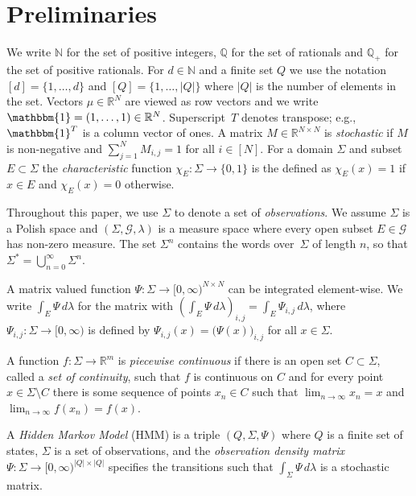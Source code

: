 \documentclass[a4paper,UKenglish,cleveref, autoref,mathscr]{lipics-v2019}
\newcommand{\RR}{\mathbb{R}}
\newcommand{\NN}{\mathbb{N}}
\newcommand{\QQ}{\mathbb{Q}}
\newcommand{\GG}{\mathscr{G}}
\newcommand{\1}{\mathbbm{1}}
\begin{document}
\section{Preliminaries}
We write $\NN$ for the set of positive integers, $\QQ$ for the set of rationals and $\QQ_+$ for the set of positive rationals.
For $d \in \NN$ and a finite set $Q$ we use the notation $[d] = \{1, \dots, d\}$ and $[Q] = \{1, \dots, |Q|\}$ where $|Q|$ is the number of elements in the set. Vectors $\mu \in \RR^N$ are viewed as row vectors and we write $\1 = (1, \dots, 1) \in \RR^N$.
Superscript~$T$ denotes transpose; e.g., $\1^T$ is a column vector of ones.
A matrix $M \in \RR^{N \times N}$ is \emph{stochastic} if $M$ is non-negative and $\sum_{j = 1}^{N} M_{i,j} = 1$ for all $i \in [N]$.
For a domain $\Sigma$ and subset $E \subset \Sigma$ the \emph{characteristic} function $\chi_E : \Sigma \rightarrow \{0,1\}$ is the defined as $\chi_E(x) = 1$ if $x \in E$ and $\chi_E(x) = 0$ otherwise.

Throughout this paper, we use $\Sigma$ to denote a set of \emph{observations}.
We assume $\Sigma$ is a Polish space and $(\Sigma, \GG, \lambda)$ is a measure space where every open subset $E \in \GG$ has non-zero measure.
The set $\Sigma^n$ contains the words over~$\Sigma$ of length $n$, so that $\Sigma^* = \bigcup_{n = 0}^\infty \Sigma^n$.


A matrix valued function $\Psi : \Sigma \rightarrow [0,\infty)^{N \times N}$ can be integrated element-wise.
We write $\int_E \Psi\,d\lambda$ for the matrix with $\left( \int_E \Psi\, d\lambda \right)_{i,j} = \int_E \Psi_{i,j}\, d\lambda$, where $\Psi_{i,j} : \Sigma \rightarrow [0,\infty)$ is defined by $\Psi_{i,j}(x) = \big( \Psi(x) \big)_{i,j}$ for all $x \in \Sigma$.


A function $f : \Sigma \rightarrow \RR^m$ is \emph{piecewise continuous} if there is an open set $C \subset \Sigma$, called a \emph{set of continuity}, such that $f$ is continuous on $C$ and for every point $x \in  \Sigma \setminus C$ there is some sequence of points $x_n \in C$ such that $\lim_{n \rightarrow \infty} x_n = x$ and $\lim_{n \rightarrow \infty} f(x_n) = f(x)$. 


\begin{definition}\label{HMMdef}
A \emph{Hidden Markov Model} (HMM) is a triple $(Q, \Sigma, \Psi)$ where $Q$ is a finite set of states, $\Sigma$ is a set of observations, and the \emph{observation density matrix} $\Psi : \Sigma \rightarrow [0,\infty)^{|Q| \times |Q|}$ specifies the transitions such that $\int_\Sigma \Psi\, d\lambda$ is a stochastic matrix.
\end{definition}
\end{document}
